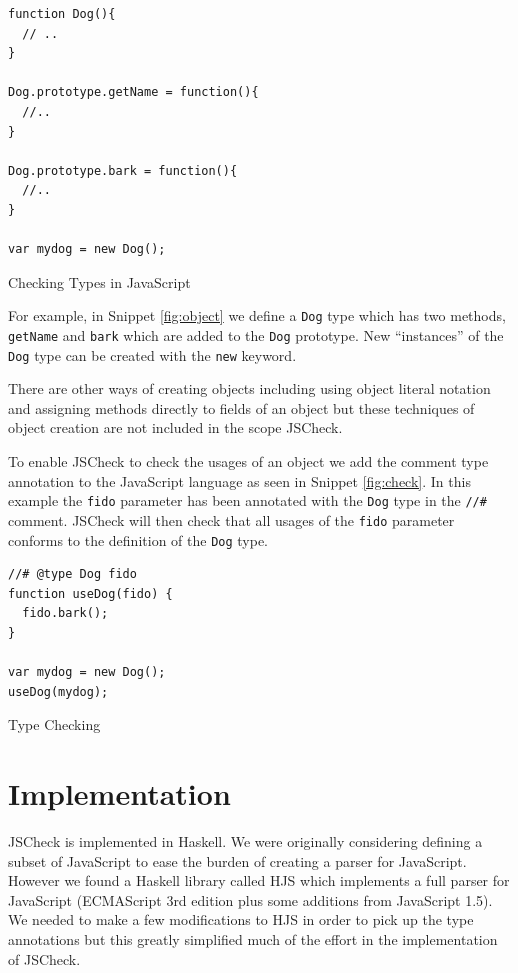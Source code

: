 \documentclass{article}
\begin{document}
\begin{program}[here]
\begin{verbatim}
function Dog(){
  // ..
}

Dog.prototype.getName = function(){
  //..
}

Dog.prototype.bark = function(){
  //..
}

var mydog = new Dog();
\end{verbatim}
\caption{Checking Types in JavaScript}
\label{fig:object}
\end{program}
\pagebreak

For example, in Snippet \ref{fig:object} we define a {\tt Dog} type
which has two methods, {\tt getName} and {\tt bark} which are added to the {\tt Dog}
prototype. New ``instances'' of the {\tt Dog} type can be created with the {\tt new}
keyword.

There are other ways of creating objects including using object literal notation
and assigning methods directly to fields of an object but these techniques of 
object creation are not included in the scope JSCheck.

To enable JSCheck to check the usages of an object we add the comment type annotation
to the JavaScript language as seen in Snippet \ref{fig:check}. In
this example the {\tt fido} parameter has been annotated with the {\tt Dog}
type in the {\tt //\#} comment. JSCheck will then check that all usages of
the {\tt fido} parameter conforms to the definition of the {\tt Dog} type.

\begin{program}[here]
\begin{verbatim}
//# @type Dog fido
function useDog(fido) {
  fido.bark();
}

var mydog = new Dog();
useDog(mydog);
\end{verbatim}
\caption{Type Checking}
\label{fig:check}
\end{program}
\pagebreak

\section{Implementation}
\label{sec:implementation}
JSCheck is implemented in Haskell. We were originally considering defining a 
subset of JavaScript to ease the burden of creating a parser for JavaScript. 
However we found a Haskell library called HJS \cite{hjsLibrary} 
which implements a full parser for JavaScript (ECMAScript 3rd edition plus 
some additions from JavaScript 1.5). We needed to make a few modifications to
HJS in order to pick up the type annotations but this greatly simplified much of
the effort in the implementation of JSCheck.
\end{document}
